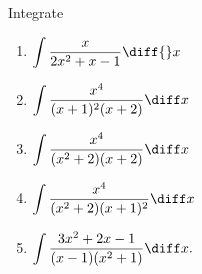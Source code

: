 Integrate 
\begin{enumerate}[ref={\fcProblemRef}]
\item \label{problemIntegrate x/(2x^2+x-1)dx}
$\displaystyle\int \frac{x }{2x^2+x-1}\diff{}x
$


\item $\displaystyle \int \frac{x^4 }{(x+1)^2(x+2) } \diff x$

\item $\displaystyle \int\frac{x^4 }{(x^2+2)(x+2) } \diff x$


\item \label{problemIntegral x^4/((x^2+2)(x+1)^2)} $\displaystyle\int \frac{x^4}{(x^2+2)(x+1)^2} \diff x $

\item \label{problemint(3x^2+2x-1)/((x-1)(x^2+1))dx} $\displaystyle\int \frac{3x^2 + 2x - 1}{(x-1)(x^2+1)} \diff x.$


\end{enumerate}
